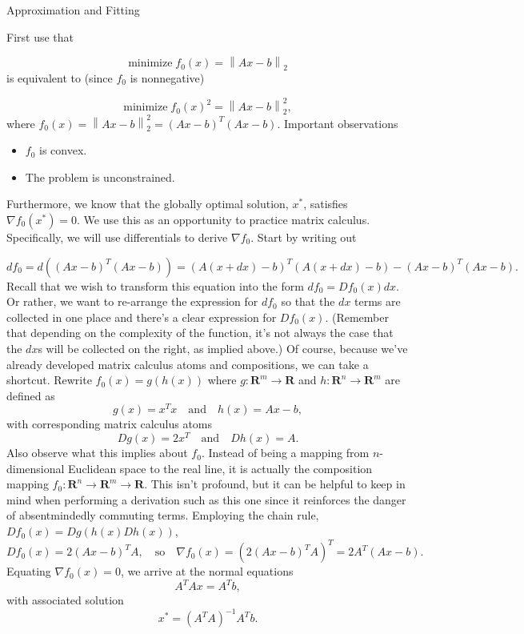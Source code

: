 \begin{chapter}{Approximation and Fitting}


    First use that

    \[\text{minimize} \; f_0(x) = \left\lVert Ax - b  \right\rVert_{2}\]
    is equivalent to (since $f_0$ is nonnegative) 

    \[\text{minimize} \; f_0(x)^2  = \left\lVert Ax - b  \right\rVert_{2}^2, \]
    where $f_0(x) = \left\lVert Ax - b \right\rVert_{2}^2 = \left(Ax-b\right)^T\left(Ax-b\right)$. Important observations
    \begin{itemize}
        \item $f_0$ is convex.
        \item The problem is unconstrained.
    \end{itemize}
    Furthermore, we know that the globally optimal solution, $x^*$, satisfies $\nabla f_0(x^*) = 0$. We use this as an opportunity
    to practice matrix calculus. Specifically, we will use differentials to derive $\nabla f_0$. Start by writing out

    \[df_0 = d \left( \left(Ax-b\right)^T\left(Ax-b\right) \right) = \left(A(x+dx)-b\right)^T\left(A(x+dx)-b\right) - \left(Ax-b\right)^T\left(Ax-b\right). \]
    Recall that we wish to transform this equation into the form $df_0 = Df_0(x)dx$. Or rather,
    we want to re-arrange the expression for $df_0$ so that the $dx$ terms are collected in one place and there's a clear expression for $Df_0(x)$. 
    (Remember that depending on the complexity of the function, it's not always the case that the $dx$s will be collected on the right, as implied above.)
    Of course, because we've already developed matrix calculus
    atoms and compositions, we can take a shortcut. Rewrite $f_0(x) = g(h(x))$ where $g: \mathbf{R}^m \to \mathbf{R}$ and $h: \mathbf{R}^n \to \mathbf{R}^m$ are defined as
    \[g(x) = x^T x \quad \text{and} \quad h(x) = Ax - b,\]
    with corresponding matrix calculus atoms
    \[Dg(x) = 2x^T \quad \text{and} \quad Dh(x) = A.\]
    Also observe what this implies about $f_0$. Instead of being a mapping from $n$-dimensional Euclidean
    space to the real line, it is actually the composition mapping $f_0: \mathbf{R}^n \to \mathbf{R}^m \to \mathbf{R}$.
    This isn't profound, but it can be helpful to keep in mind when performing a derivation such as this one
    since it reinforces the danger of absentmindedly commuting terms. Employing the chain rule, $Df_0(x) = Dg(h(x)Dh(x))$,
    \[Df_0(x) = 2(Ax - b)^T A, \quad \text{so} \quad \nabla f_0(x) = \left(2(Ax - b)^T A \right)^T = 2A^T(Ax-b).\]
    Equating $\nabla f_0(x) = 0$, we arrive at the normal equations 
    \[A^TAx = A^Tb,\]
    with associated solution
    \[x^* = (A^TA)^{-1} A^T b.\]


\end{chapter}
